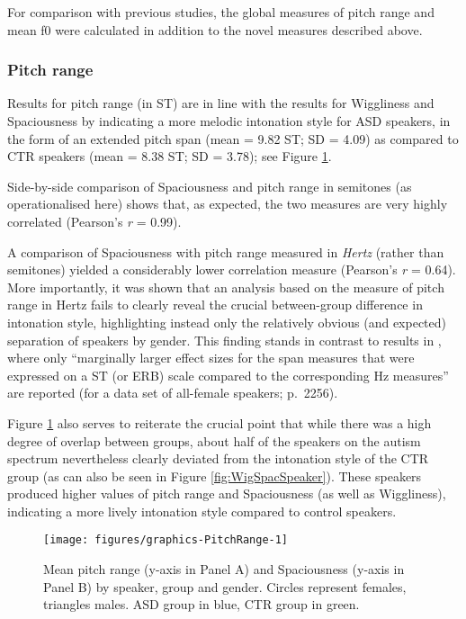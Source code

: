 For comparison with previous studies, the global measures of pitch range and mean f0 were calculated in addition to the novel measures described above.

	\subsubsection{Pitch range}\label{int_results_overall_comparison_range}

Results for pitch range (in ST) are in line with the results for Wiggliness and Spaciousness by indicating a more melodic intonation style for ASD speakers, in the form of an extended pitch span (mean = 9.82 ST; SD = 4.09) as compared to CTR speakers (mean = 8.38 ST; SD = 3.78); see Figure \ref{fig:PitchRange}.

Side-by-side comparison of Spaciousness and pitch range in semitones (as operationalised here) shows that, as expected, the two measures are very highly correlated (Pearson's \emph{r} = 0.99).

A comparison of Spaciousness with pitch range measured in \emph{Hertz} (rather than semitones) yielded a considerably lower correlation measure (Pearson's \emph{r} = 0.64). More importantly, it was shown that an analysis based on the measure of pitch range in Hertz fails to clearly reveal the crucial between-group difference in intonation style, highlighting instead only the relatively obvious (and expected) separation of speakers by gender. This finding stands in contrast to results in \citet{mennenCrosslanguageDifferencesFundamental2012a}, where only ``marginally larger effect sizes for the span measures that were expressed on a ST (or ERB) scale compared to the corresponding Hz measures'' are reported (for a data set of all-female speakers; p.~2256).

Figure \ref{fig:PitchRange} also serves to reiterate the crucial point that while there was a high degree of overlap between groups, about half of the speakers on the autism spectrum nevertheless clearly deviated from the intonation style of the CTR group (as can also be seen in Figure \ref{fig:WigSpacSpeaker}). These speakers produced higher values of pitch range and Spaciousness (as well as Wiggliness), indicating a more lively intonation style compared to control speakers.



\begin{figure}
	
	{\texttt{[image: figures/graphics-PitchRange-1]}
		
	}
	
	\caption{Mean pitch range (y-axis in Panel A) and Spaciousness (y-axis in Panel B) by speaker, group and gender. Circles represent females, triangles males. ASD group in blue, CTR group in green.}\label{fig:PitchRange}
\end{figure}

